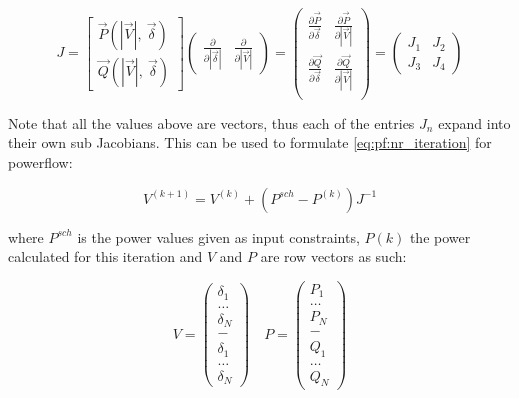 \begin{equation}
    J =  
    \begin{bmatrix}
        \vec{P}(|\vec{V}|, \ \vec{\delta})\\
        \vec{Q}(|\vec{V}|, \ \vec{\delta})
    \end{bmatrix}
    \begin{pmatrix}
        \frac{\partial}{\partial |\vec{\delta}|} & \frac{\partial}{\partial |\vec{V}|}
    \end{pmatrix}
    =
    \begin{pmatrix}
        \frac{\partial \vec{P}}{\partial \vec{\delta}} & \frac{\partial \vec{P} }{\partial |\vec{V}|}\\
        \frac{\partial \vec{Q}}{\partial \vec{\delta}} & \frac{\partial \vec{Q} }{\partial |\vec{V}|}\\
    \end{pmatrix}
    =
    \begin{pmatrix}
        J_1 & J_2\\
        J_3 & J_4
    \end{pmatrix}
    \label{eq:pf:nr_pf_jacobi}
\end{equation}

Note that all the values above are vectors, thus each of the entries $J_n$ expand into
their own sub Jacobians.
This can be used to formulate \ref{eq:pf:nr_iteration} for powerflow:

\begin{equation}
    V^{(k+1)} = V^{(k)} + (P^{sch} - P^{(k)})J^{-1}
\end{equation}

where $P^{sch}$ is the power values given as input constraints, $P(k)$ the power
calculated for this iteration and $V$ and $P$ are row vectors as such:

\begin{equation}
    V = 
    \begin{pmatrix}
        \delta_1\\
        \dots\\
        \delta_N\\
        -\\
        \delta_1\\
        \dots\\
        \delta_N
    \end{pmatrix}
    \quad
    P = 
    \begin{pmatrix}
        P_1\\
        \dots\\
        P_N\\
        -\\
        Q_1\\
        \dots\\
        Q_N
    \end{pmatrix}
\end{equation}

